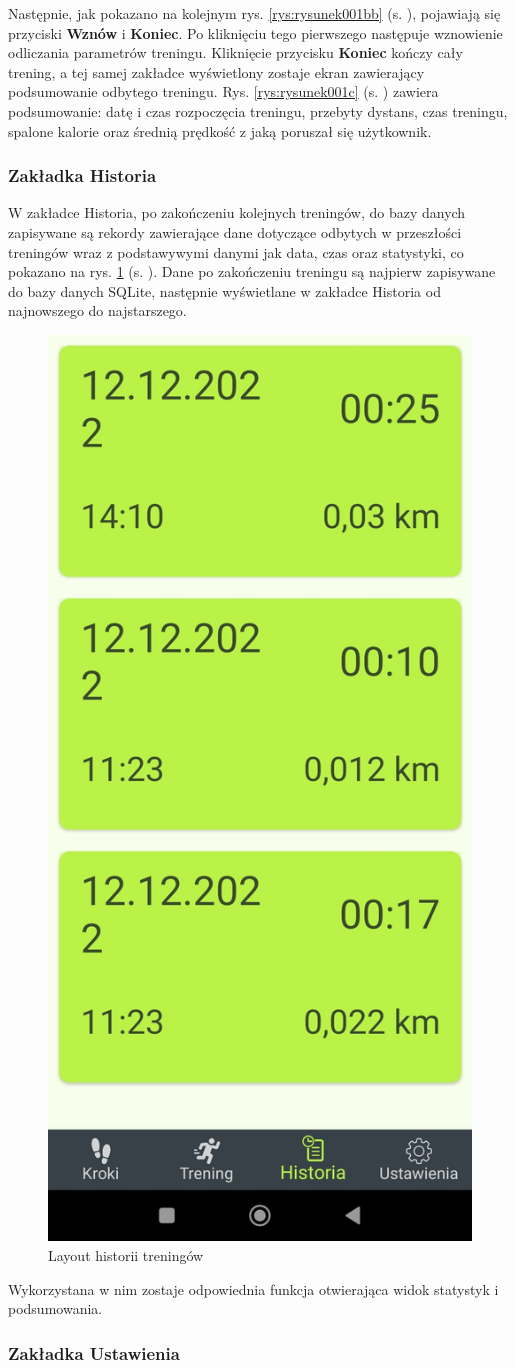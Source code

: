 Następnie, jak pokazano na kolejnym rys. \ref{rys:rysunek001bb} (s. \pageref{rys:rysunek001bb}), pojawiają się przyciski \textbf{Wznów} i \textbf{Koniec}. Po kliknięciu tego pierwszego następuje wznowienie odliczania parametrów treningu. Kliknięcie przycisku \textbf{Koniec} kończy cały trening, a tej samej zakładce wyświetlony zostaje ekran zawierający podsumowanie odbytego treningu. Rys. \ref{rys:rysunek001c} (s. \pageref{rys:rysunek001c}) zawiera podsumowanie: datę i czas rozpoczęcia treningu, przebyty dystans, czas treningu, spalone kalorie oraz średnią prędkość z jaką poruszał się użytkownik. 

\subsubsection{Zakładka Historia} %

\hspace{0.60cm}W zakładce Historia, po zakończeniu kolejnych treningów, do bazy danych zapisywane są rekordy zawierające dane dotyczące odbytych w przeszłości treningów wraz z podstawywymi danymi jak data, czas oraz statystyki, co pokazano na rys. \ref{rys:rysunek001d} (s. \pageref{rys:rysunek001d}). Dane po zakończeniu treningu są najpierw zapisywane do bazy danych SQLite, następnie wyświetlane w zakładce Historia od najnowszego do najstarszego.

\begin{figure}[!htb]
	\centering
	\includegraphics[width=.2\linewidth]{rys/historia2.jpg}
	\caption{Layout historii treningów}
	\label{rys:rysunek001d}
\end{figure}

Wykorzystana w nim zostaje odpowiednia funkcja otwierająca widok statystyk i podsumowania.

\subsubsection{Zakładka Ustawienia} %

